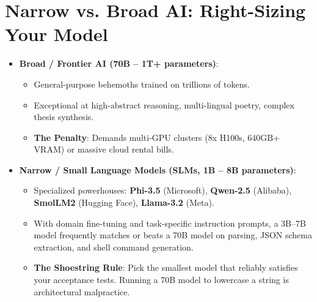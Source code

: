 \documentclass[11pt,a4paper]{article}
\begin{document}
\section{Narrow vs. Broad AI: Right-Sizing Your Model}
\begin{itemize}
    \item \textbf{Broad / Frontier AI (70B -- 1T+ parameters)}:
    \begin{itemize}
        \item General-purpose behemoths trained on trillions of tokens.
        \item Exceptional at high-abstract reasoning, multi-lingual poetry, complex thesis synthesis.
        \item \textbf{The Penalty}: Demands multi-GPU clusters (8x H100s, 640GB+ VRAM) or massive cloud rental bills.
    \end{itemize}
    \item \textbf{Narrow / Small Language Models (SLMs, 1B -- 8B parameters)}:
    \begin{itemize}
        \item Specialized powerhouses: \textbf{Phi-3.5} (Microsoft), \textbf{Qwen-2.5} (Alibaba), \textbf{SmolLM2} (Hugging Face), \textbf{Llama-3.2} (Meta).
        \item With domain fine-tuning and task-specific instruction prompts, a 3B--7B model frequently matches or beats a 70B model on parsing, JSON schema extraction, and shell command generation.
        \item \textbf{The Shoestring Rule}: Pick the smallest model that reliably satisfies your acceptance tests. Running a 70B model to lowercase a string is architectural malpractice.
    \end{itemize}
\end{itemize}

\end{document}
